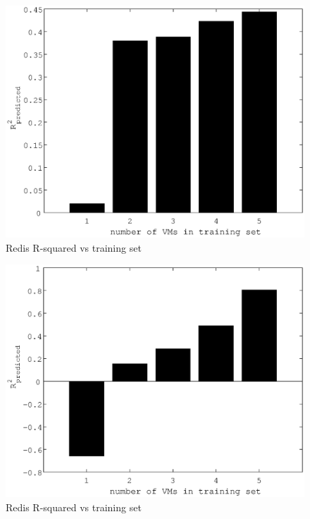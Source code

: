 \documentclass{acm_proc_article-sp}
\begin{document}
\begin{figure}
\centering
\includegraphics[scale = 0.5]{bar_read_avg_latency_r3__r3_2x_m3_2x_m3__m3_x_r3_x.eps}
\caption{Redis R-squared vs training set}
\label{figure:redisbarread}
\end{figure}

\begin{figure}
\centering
\includegraphics[scale = 0.5]{bar_read_avg_latency_r3_2x_r3_x_m3_2x_m3_x_r3__m3_.eps}
\caption{Redis R-squared vs training set}
\label{figure:redisbarread}
\end{figure}
\end{document}
